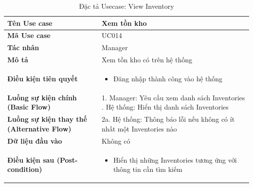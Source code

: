 \documentclass[12pt,a4paper]{report}
\begin{document}
\begin{longtable}{|>{\raggedright\arraybackslash\bfseries}p{4.5cm}|p{11cm}|}
\caption{Đặc tả Usecase: View Inventory} \label{tab:uc_view_inventory} \\
\hline
Tên Use case & Xem tồn kho \\ \hline
Mã Use case & UC014 \\ \hline
Tác nhân & Manager \\ \hline
Mô tả & Xem tồn kho có trên hệ thống \\ \hline
Điều kiện tiên quyết & 
\begin{itemize}[leftmargin=*, nosep, topsep=0pt, partopsep=0pt]
    \item Đăng nhập thành công vào hệ thống
\end{itemize} \\ \hline
Luồng sự kiện chính (Basic Flow) & 
1. Manager: Yêu cầu xem danh sách Inventories \newline
2. Hệ thống: Hiển thị danh sách Inventories \\ \hline
Luồng sự kiện thay thế (Alternative Flow) & 
2a. Hệ thống: Thông báo lỗi nếu không có ít nhất một Inventories nào \\ \hline
Dữ liệu đầu vào & Không có \\ \hline
Điều kiện sau (Post-condition) & 
\begin{itemize}[leftmargin=*, nosep, topsep=0pt, partopsep=0pt]
    \item Hiển thị những Inventories tương ứng với thông tin cần tìm kiếm
\end{itemize} \\ \hline
\end{longtable}

\vspace{0.5cm}
\end{document}
